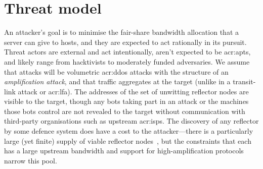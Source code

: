 %

\section{Threat model}\label{sec:ddos-threat}
An attacker's goal is to minimise the fair-share bandwidth allocation that a server can give to hosts, and they are expected to act rationally in its pursuit.
Threat actors are external and act intentionally, aren't expected to be 
\glspl{acr:apt}, and likely range from hacktivists to moderately funded adversaries.
We assume that attacks will be volumetric \gls{acr:ddos} attacks with the structure of an \emph{amplification attack}, and that traffic aggregates at the target (unlike in a transit-link attack or \gls{acr:lfa}).
The addresses of the set of unwitting reflector nodes are visible to the target, though any bots taking part in an attack or the machines those bots control are not revealed to the target without communication with third-party organisations such as upstream \glspl{acr:isp}.
The discovery of any reflector by some defence system does have a cost to the attacker---there is a particularly large (yet finite) supply of viable reflector nodes~\parencite{DBLP:conf/ndss/Rossow14}, but the constraints that each has a large upstream bandwidth and support for high-amplification protocols narrow this pool.

